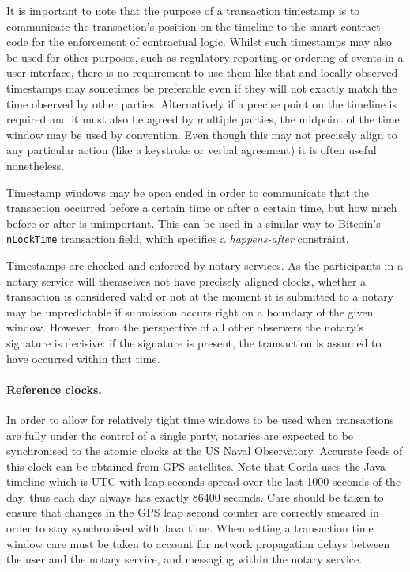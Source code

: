\documentclass{article}
\begin{document}
It is important to note that the purpose of a transaction timestamp is to communicate the transaction's position
on the timeline to the smart contract code for the enforcement of contractual logic. Whilst such timestamps may
also be used for other purposes, such as regulatory reporting or ordering of events in a user interface, there is
no requirement to use them like that and locally observed timestamps may sometimes be preferable even if they will
not exactly match the time observed by other parties. Alternatively if a precise point on the timeline is required
and it must also be agreed by multiple parties, the midpoint of the time window may be used by convention. Even
though this may not precisely align to any particular action (like a keystroke or verbal agreement) it is often
useful nonetheless.

Timestamp windows may be open ended in order to communicate that the transaction occurred before a certain
time or after a certain time, but how much before or after is unimportant. This can be used in a similar
way to Bitcoin's \texttt{nLockTime} transaction field, which specifies a \emph{happens-after} constraint.

Timestamps are checked and enforced by notary services. As the participants in a notary service will themselves
not have precisely aligned clocks, whether a transaction is considered valid or not at the moment it is submitted
to a notary may be unpredictable if submission occurs right on a boundary of the given window. However, from the
perspective of all other observers the notary's signature is decisive: if the signature is present, the transaction
is assumed to have occurred within that time.

\paragraph{Reference clocks.}In order to allow for relatively tight time windows to be used when transactions are fully
under the control of a single party, notaries are expected to be synchronised to the atomic clocks at the US Naval
Observatory. Accurate feeds of this clock can be obtained from GPS satellites. Note that Corda uses the Java
timeline\cite{JavaTimeScale} which is UTC with leap seconds spread over the last 1000 seconds of the day, thus each day
always has exactly 86400 seconds. Care should be taken to ensure that changes in the GPS leap second counter are
correctly smeared in order to stay synchronised with Java time. When setting a transaction time window care must be
taken to account for network propagation delays between the user and the notary service, and messaging within the notary
service.
\end{document}
